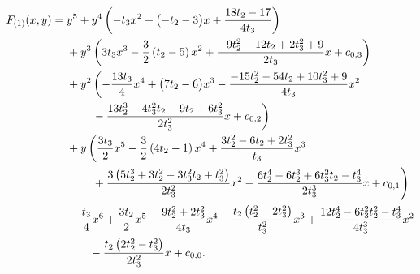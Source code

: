 \begin{align}
    \label{curve:potts_fixed}
    F_{(1)}(x,y)={} & y^{5}{}+y^{4}\left(-t_3x^{2} + \bigl(-t_2-3\bigr)x + \frac{18 t_2-17}{4 t_3}\right)\notag \\
                    & {}+y^{3}\left(3 t_3x^{3} - \frac{3}{2} \left(t_2-5\right)x^{2} + \frac{-9 t_2^2-12 t_2+2 t_3^2+9}{2 t_3}x + c_{0,3}\right)\notag \\
                    & {}+y^{2}\left(-\frac{13 t_3}{4}x^{4} + \bigl(7 t_2-6\bigr)x^{3} - \frac{-15 t_2^2-54 t_2+10 t_3^2+9}{4 t_3}x^{2}\right.\notag \\*
                    & \qquad{}\left.{}- \frac{13 t_2^3-4 t_3^2 t_2-9 t_2+6 t_3^2}{2 t_3^2}x + c_{0,2}\right)\notag \\
                    & {}+y\left(\frac{3 t_3}{2}x^{5} - \frac{3}{2} \left(4 t_2-1\right)x^{4} + \frac{3 t_2^2-6 t_2+2 t_3^2}{t_3}x^{3}\right.\notag \\*
                    & \qquad{}\left.{}+ \frac{3 \left(5 t_2^3+3 t_2^2-3 t_3^2 t_2+t_3^2\right)}{2 t_3^2}x^{2} - \frac{6 t_2^4-6 t_2^3+6 t_3^2 t_2-t_3^4}{2 t_3^3}x + c_{0,1}\right)\notag \\
                    & {}-\frac{t_3}{4}x^{6} + \frac{3 t_2}{2}x^{5} - \frac{9 t_2^2+2 t_3^2}{4 t_3}x^{4} - \frac{t_2 \left(t_2^2-2 t_3^2\right)}{t_3^2}x^{3} + \frac{12 t_2^4-6 t_3^2 t_2^2-t_3^4}{4 t_3^3}x^{2}\notag \\
                    & \qquad{}- \frac{t_2 \left(2 t_2^2-t_3^2\right)}{2 t_3^2}x + c_{0,0}.
\end{align}
